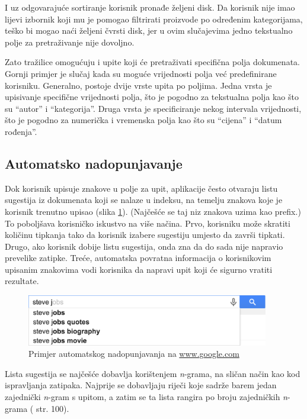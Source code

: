 \documentclass[a4paper,twoside,12pt]{scrreprt}
\begin{document}
I uz odgovarajuće sortiranje korisnik pronađe željeni disk. Da korisnik nije imao lijevi izbornik koji mu je pomogao filtrirati proizvode po određenim kategorijama, teško bi mogao naći željeni čvrsti disk, jer u ovim slučajevima jedno tekstualno polje za pretraživanje nije dovoljno.

Zato tražilice omogućuju i upite koji će pretraživati specifična polja dokumenata. Gornji primjer je slučaj kada su moguće vrijednosti polja već predefinirane korisniku. Generalno, postoje dvije vrste upita po poljima. Jedna vrsta je upisivanje specifične vrijednosti polja, što je pogodno za tekstualna polja kao što su ``autor'' i ``kategorija''. Druga vrsta je specificiranje nekog intervala vrijednosti, što je pogodno za numerička i vremenska polja kao što su ``cijena'' i ``datum rođenja''.


\subsection{Automatsko nadopunjavanje}

Dok korisnik upisuje znakove u polje za upit, aplikacije često otvaraju listu sugestija iz dokumenata koji se nalaze u indeksu, na temelju znakova koje je korisnik trenutno upisao (slika \ref{typeahead}). (Najčešće se taj niz znakova uzima kao prefix.) To poboljšava korisničko iskustvo na više načina. Prvo, korisniku može skratiti količinu tipkanja tako da korisnik izabere sugestiju umjesto da završi tipkati. Drugo, ako korisnik dobije listu sugestija, onda zna da do sada nije napravio prevelike zatipke. Treće, automatska povratna informacija o korisnikovim upisanim znakovima vodi korisnika da napravi upit koji će sigurno vratiti rezultate.

\begin{figure}[H]
  \centering
  \includegraphics[width=300pt]{typeahead}
  \caption{Primjer automatskog nadopunjavanja na \url{www.google.com}}
  \label{typeahead}
\end{figure}

Lista sugestija se najčešće dobavlja korištenjem \textit{n}-grama, na sličan način kao kod ispravljanja zatipaka. Najprije se dobavljaju riječi koje sadrže barem jedan zajednički \textit{n}-gram s upitom, a zatim se ta lista rangira po broju zajedničkih \textit{n}-grama (\cite{taming} str. 100).
\end{document}
